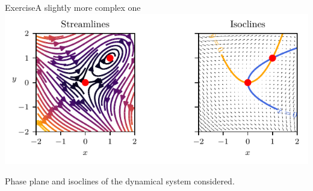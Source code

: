 \documentclass[usenames,dvipsnames,svgnames,10pt,aspectratio=169]{beamer}
\begin{document}
\begin{frame}[t, c]{Exercise}{A slightly more complex one}
	\centering
	\includegraphics[width=.75\textwidth]{exercise_phase_plane_bis}

	Phase plane and isoclines of the dynamical system considered.

	\vspace{1cm}
\end{frame}
\end{document}
